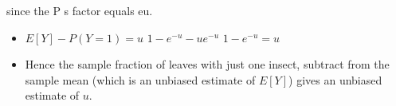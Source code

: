 \documentclass[a4paper,12pt]{article}
\begin{document}
\begin{enumerate}
 since the
P
s factor
equals eu.
\begin{itemize}
\item $E[Y ] - P(Y = 1) = u$
$1-e^{-u} - ue^{-u}$
$1-e^{-u} = u$
\item Hence the sample fraction of leaves with just one insect, subtract from the sample
mean (which is an unbiased estimate of $E[Y]$) gives an unbiased estimate of $u$.
\end{itemize}
\end{enumerate}
\end{document}
